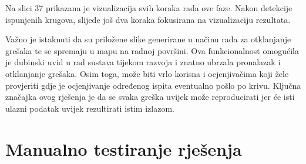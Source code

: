 \documentclass{foi}
\begin{document}
Na slici 37 prikazana je vizualizacija svih koraka rada ove faze. Nakon detekcije ispunjenih krugova, slijede još dva koraka fokusirana na vizualizaciju rezultata.

Važno je istaknuti da su priložene slike generirane u načinu rada za otklanjanje grešaka te se spremaju u mapu na radnoj površini. Ova funkcionalnost omogućila je dubinski uvid u rad sustava tijekom razvoja i znatno ubrzala pronalazak i otklanjanje grešaka. Osim toga, može biti vrlo korisna i ocjenjivačima koji žele provjeriti gdje je ocjenjivanje određenog ispita eventualno pošlo po krivu. Ključna značajka ovog rješenja je da se svaka greška uvijek može reproducirati jer će isti ulazni podatak uvijek rezultirati istim izlazom.

\section{Manualno testiranje rješenja}
\end{document}
